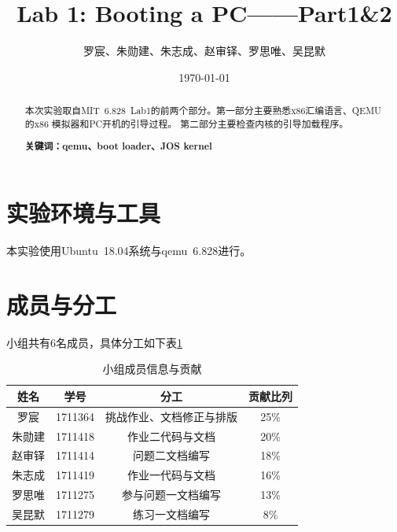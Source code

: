 \documentclass[12pt,a4paper,UTF8]{article}
\begin{document}
\title{Lab 1: Booting a PC——Part1\&2}
\author{罗宸、朱勋建、朱志成、赵审铎、罗思唯、吴昆默}
\date{\today}

\maketitle

\begin{abstract}
    \setlength{\parindent}{2em}
    本次实验取自MIT\ 6.828\ Lab1的前两个部分。第一部分主要熟悉x86汇编语言、QEMU的x86 模拟器和PC开机的引导过程。
    第二部分主要检查内核的引导加载程序。

    \textbf{关键词：qemu、boot loader、JOS kernel}
\end{abstract}





\section{实验环境与工具}

本实验使用Ubuntu\ 18.04系统与qemu\ 6.828进行。


\section{成员与分工}

\setcounter{table}{0}
\setcounter{figure}{0}

小组共有6名成员，具体分工如下表\ref{tab::table1}
\begin{table}[htbp]
    \begin{center}
        \begin{tabular}{c c c c}
            \toprule
            姓名 & 学号 & 分工 & 贡献比列\\
            \midrule
            罗宸   & 1711364 & 挑战作业、文档修正与排版 & 25\% \\
            朱勋建 & 1711418 & 作业二代码与文档         & 20\% \\
            赵审铎 & 1711414 & 问题二文档编写           & 18\% \\
            朱志成 & 1711419 & 作业一代码与文档         & 16\% \\
            罗思唯 & 1711275 & 参与问题一文档编写       & 13\% \\
            吴昆默 & 1711279 & 练习一文档编写       	& 8\% \\
            \bottomrule
        \end{tabular}
        \caption{小组成员信息与贡献}\label{tab::table1}
    \end{center}
\end{table}
\end{document}
